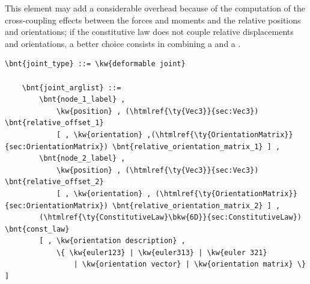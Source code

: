 \noindent
This element may add a considerable overhead because of the computation
of the cross-coupling effects between the forces and moments and the
relative positions and orientations; if the constitutive law does not couple
relative displacements and orientations, a better choice consists 
in combining a  and a .
\begin{Verbatim}[commandchars=\\\{\}]
    \bnt{joint_type} ::= \kw{deformable joint}

    \bnt{joint_arglist} ::= 
        \bnt{node_1_label} ,
            \kw{position} , (\htmlref{\ty{Vec3}}{sec:Vec3}) \bnt{relative_offset_1}
            [ , \kw{orientation} ,(\htmlref{\ty{OrientationMatrix}}{sec:OrientationMatrix}) \bnt{relative_orientation_matrix_1} ] ,
        \bnt{node_2_label} ,
            \kw{position} , (\htmlref{\ty{Vec3}}{sec:Vec3}) \bnt{relative_offset_2}
            [ , \kw{orientation} , (\htmlref{\ty{OrientationMatrix}}{sec:OrientationMatrix}) \bnt{relative_orientation_matrix_2} ] ,
        (\htmlref{\ty{ConstitutiveLaw}\bkw{6D}}{sec:ConstitutiveLaw}) \bnt{const_law}
        [ , \kw{orientation description} ,
            \{ \kw{euler123} | \kw{euler313} | \kw{euler 321}
                | \kw{orientation vector} | \kw{orientation matrix} \} ]
\end{Verbatim}

